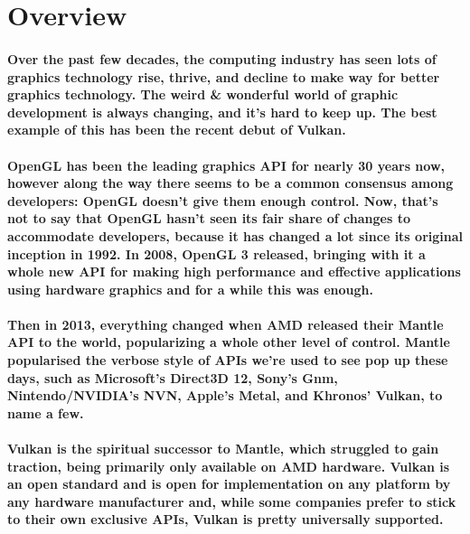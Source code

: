 \section{\textsf{Overview}}\label{overview}

\paragraph{
Over the past few decades, the computing industry has seen lots of
graphics technology rise, thrive, and decline to make way for better graphics technology. The weird \& wonderful world of graphic development is always changing, and it's hard to keep up. The best example of this has been the recent debut of Vulkan.
}

\paragraph{
OpenGL has been the leading graphics API for nearly 30 years now,
however along the way there seems to be a common consensus among
developers: OpenGL doesn't give them enough control. Now, that's not to say that OpenGL hasn't seen its fair share of changes to accommodate developers, because it has changed a lot since its original inception in 1992.
In 2008, OpenGL 3 released, bringing with it a whole new API for making high performance and effective applications using hardware graphics and for a while this was enough.
}

\paragraph{
Then in 2013, everything changed when AMD released their Mantle API to the world, popularizing a whole other level of control. Mantle popularised the verbose style of APIs we're used to see pop up these days, such as Microsoft's Direct3D 12, Sony's Gnm, Nintendo/NVIDIA's NVN, Apple's Metal, and Khronos' Vulkan, to name a few.
}

\paragraph{
Vulkan is the spiritual successor to Mantle, which struggled to gain traction, being primarily only available on AMD hardware. Vulkan is an open standard and is open for implementation on any platform by any hardware manufacturer and, while some companies prefer to stick to their own exclusive APIs, Vulkan is pretty universally supported.
}

